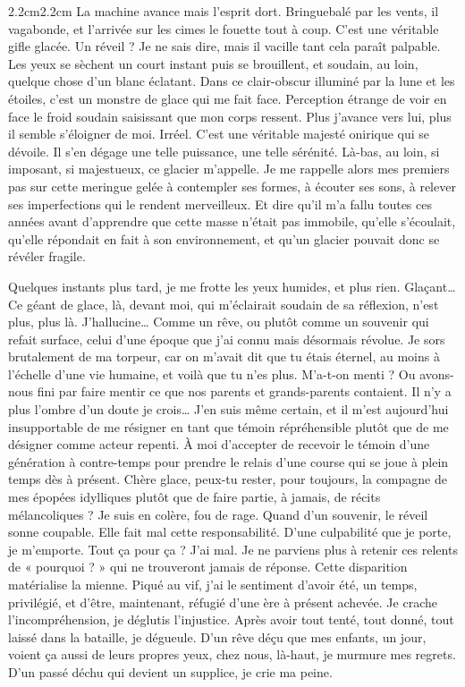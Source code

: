 \begin{adjustwidth}{2.2cm}{2.2cm}
La machine avance mais l’esprit dort. Bringuebalé par les vents, il vagabonde, et l’arrivée sur les cimes le fouette tout à coup. C’est une véritable gifle glacée. Un réveil ? Je ne sais dire, mais il vacille tant cela paraît palpable. Les yeux se sèchent un court instant puis se brouillent, et soudain, au loin, quelque chose d’un blanc éclatant. Dans ce clair-obscur illuminé par la lune et les étoiles, c’est un monstre de glace qui me fait face. Perception étrange de voir en face le froid soudain saisissant que mon corps ressent. Plus j’avance vers lui, plus il semble s’éloigner de moi. Irréel. C’est une véritable majesté onirique qui se dévoile. Il s’en dégage une telle puissance, une telle sérénité. Là-bas, au loin, si imposant, si majestueux, ce glacier m’appelle. Je me rappelle alors mes premiers pas sur cette meringue gelée à contempler ses formes, à écouter ses sons, à relever ses imperfections qui le rendent merveilleux. Et dire qu’il m’a fallu toutes ces années avant d’apprendre que cette masse n’était pas immobile, qu’elle s’écoulait, qu’elle répondait en fait à son environnement, et qu’un glacier pouvait donc se révéler fragile.

Quelques instants plus tard, je me frotte les yeux humides, et plus rien. Glaçant… Ce géant de glace, là, devant moi, qui m’éclairait soudain de sa réflexion, n’est plus, plus là. J’hallucine… Comme un rêve, ou plutôt comme un souvenir qui refait surface, celui d’une époque que j’ai connu mais désormais révolue. Je sors brutalement de ma torpeur, car on m’avait dit que tu étais éternel, au moins à l’échelle d’une vie humaine, et voilà que tu n’es plus. M’a-t-on menti ? Ou avons-nous fini par faire mentir ce que nos parents et grands-parents contaient. Il n’y a plus l’ombre d’un doute je crois… J’en suis même certain, et il m’est aujourd’hui insupportable de me résigner en tant que témoin répréhensible plutôt que de me désigner comme acteur repenti. À moi d’accepter de recevoir le témoin d’une génération à contre-temps pour prendre le relais d’une course qui se joue à plein temps dès à présent. Chère glace, peux-tu rester, pour toujours, la compagne de mes épopées idylliques plutôt que de faire partie, à jamais, de récits mélancoliques ?
Je suis en colère, fou de rage. Quand d’un souvenir, le réveil sonne coupable. Elle fait mal cette responsabilité. D’une culpabilité que je porte, je m’emporte. Tout ça pour ça ? J’ai mal. Je ne parviens plus à retenir ces relents de « pourquoi ? » qui ne trouveront jamais de réponse. Cette disparition matérialise la mienne. Piqué au vif, j’ai le sentiment d’avoir été, un temps, privilégié, et d’être, maintenant, réfugié d’une ère à présent achevée. Je crache l’incompréhension, je déglutis l’injustice. Après avoir tout tenté, tout donné, tout laissé dans la bataille, je dégueule. D’un rêve déçu que mes enfants, un jour, voient ça aussi de leurs propres yeux, chez nous, là-haut, je murmure mes regrets. D’un passé déchu qui devient un supplice, je crie ma peine. 


\end{adjustwidth}

